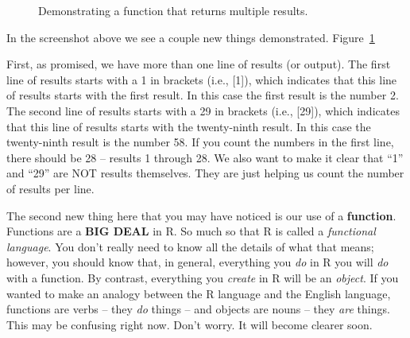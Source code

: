 \documentclass[
  letterpaper,
  DIV=11,
  numbers=noendperiod]{scrreprt}
\begin{document}
\begin{figure}


\caption{\label{fig-seqfunction}Demonstrating a function that returns
multiple results.}

\end{figure}%

In the screenshot above we see a couple new things demonstrated.
Figure~\ref{fig-seqfunction}

First, as promised, we have more than one line of results (or output).
The first line of results starts with a 1 in brackets (i.e., {[}1{]}),
which indicates that this line of results starts with the first result.
In this case the first result is the number 2. The second line of
results starts with a 29 in brackets (i.e., {[}29{]}), which indicates
that this line of results starts with the twenty-ninth result. In this
case the twenty-ninth result is the number 58. If you count the numbers
in the first line, there should be 28 -- results 1 through 28. We also
want to make it clear that ``1'' and ``29'' are NOT results themselves.
They are just helping us count the number of results per line.

The second new thing here that you may have noticed is our use of a
\textbf{function}. Functions are a \textbf{BIG DEAL} in R. So much so
that R is called a \emph{functional language}. You don't really need to
know all the details of what that means; however, you should know that,
in general, everything you \emph{do} in R you will \emph{do} with a
function. By contrast, everything you \emph{create} in R will be an
\emph{object}. If you wanted to make an analogy between the R language
and the English language, functions are verbs -- they \emph{do} things
-- and objects are nouns -- they \emph{are} things. This may be
confusing right now. Don't worry. It will become clearer soon.
\end{document}

